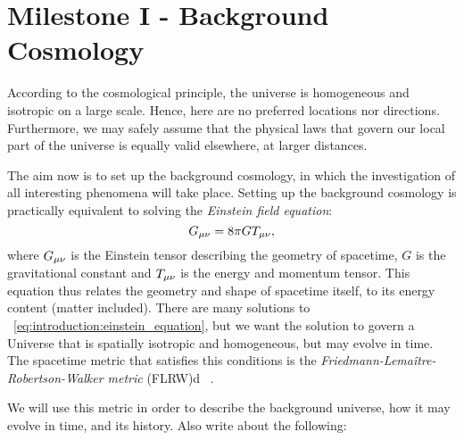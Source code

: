\section{Milestone I - Background Cosmology}\label{sec:m1}

According to the cosmological principle, the universe is homogeneous and isotropic on a large scale. Hence, here are no preferred locations nor directions. Furthermore, we may safely assume that the physical laws that govern our local part of the universe is equally valid elsewhere, at larger distances. 

The aim now is to set up the background cosmology, in which the investigation of all interesting phenomena will take place. Setting up the background cosmology is practically equivalent to solving the \textit{Einstein field equation}:
\begin{equation}\label{eq:introduction:einstein_equation}
    G_{\mu\nu} = 8\pi GT_{\mu\nu},
\end{equation}
where $G_{\mu\nu}$ is the Einstein tensor describing the geometry of spacetime, $G$ is the gravitational constant and $T_{\mu\nu}$ is the energy and momentum tensor. This equation thus relates the geometry and shape of spacetime itself, to its energy content (matter included). There are many solutions to ~\cref{eq:introduction:einstein_equation}, but we want the solution to govern a Universe that is spatially isotropic and homogeneous, but may evolve in time. The spacetime metric that satisfies this conditions is the \textit{Friedmann-Lemaître-Robertson-Walker metric} (FLRW)d ~\cite[ch. 8]{carroll_2019}.

We will use this metric in order to describe the background universe, how it may evolve in time, and its history. 
Also write about the following:





